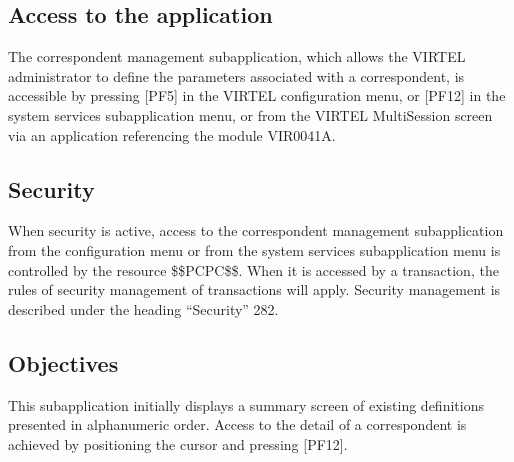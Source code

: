 \documentclass[letterpaper,10pt,english]{sphinxmanual}
\begin{document}
\ignorespaces 

\subsection{Access to the application}
\label{\detokenize{audit_operations_ and_performance:access-to-the-application}}\label{\detokenize{audit_operations_ and_performance:index-49}}
\sphinxAtStartPar
The correspondent management sub\sphinxhyphen{}application, which allows the VIRTEL administrator to define the parameters
associated with a correspondent, is accessible by pressing {[}PF5{]} in the VIRTEL configuration menu, or {[}PF12{]} in the
system services sub\sphinxhyphen{}application menu, or from the VIRTEL Multi\sphinxhyphen{}Session screen via an application referencing the
module VIR0041A.

\ignorespaces 

\subsection{Security}
\label{\detokenize{audit_operations_ and_performance:security}}\label{\detokenize{audit_operations_ and_performance:index-50}}
\sphinxAtStartPar
When security is active, access to the correspondent management sub\sphinxhyphen{}application from the configuration menu or
from the system services sub\sphinxhyphen{}application menu is controlled by the resource \$\$PCPC\$\$.
When it is accessed by a transaction, the rules of security management of transactions will apply.
Security management is described under the heading “Security” 282.

\ignorespaces 

\subsection{Objectives}
\label{\detokenize{audit_operations_ and_performance:objectives}}\label{\detokenize{audit_operations_ and_performance:index-51}}
\sphinxAtStartPar
This sub\sphinxhyphen{}application initially displays a summary screen of existing definitions presented in alphanumeric order. Access
to the detail of a correspondent is achieved by positioning the cursor and pressing {[}PF12{]}.
\end{document}
